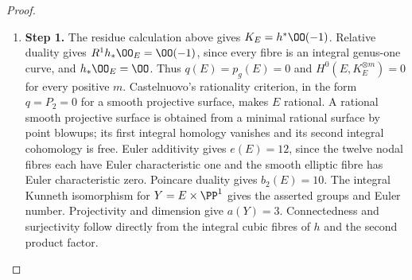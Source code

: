 \begin{proof}
\begin{enumerate}[label={$\langle1\rangle$\arabic*.},leftmargin=*]
\item 
\noindent\textbf{Step 1.} The residue calculation above gives $K_E=h^*\OO(-1)$. Relative duality gives $R^1h_*\OO_E=\OO(-1)$, since every fibre is an integral genus-one curve, and $h_*\OO_E=\OO$. Thus $q(E)=p_g(E)=0$ and $H^0(E,K_E^{\otimes m})=0$ for every positive $m$. Castelnuovo's rationality criterion, in the form $q=P_2=0$ for a smooth projective surface, makes $E$ rational. A rational smooth projective surface is obtained from a minimal rational surface by point blowups; its first integral homology vanishes and its second integral cohomology is free. Euler additivity gives $e(E)=12$, since the twelve nodal fibres each have Euler characteristic one and the smooth elliptic fibre has Euler characteristic zero. Poincare duality gives $b_2(E)=10$. The integral Kunneth isomorphism for $Y=E\times\PP^1$ gives the asserted groups and Euler number. Projectivity and dimension give $a(Y)=3$. Connectedness and surjectivity follow directly from the integral cubic fibres of $h$ and the second product factor.

\end{enumerate}
\end{proof}
